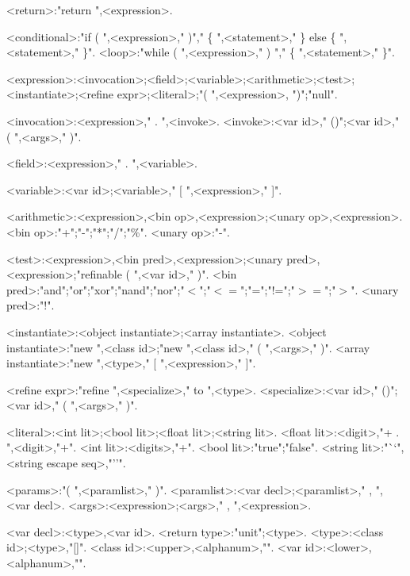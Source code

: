 \begin{grammar}
<return>:"return ",<expression>.

<conditional>:"if ( ",<expression>," )"," \{ ",<statement>,"{\small *} \} else \{ ",<statement>,"{\small *} \}".
<loop>:"while ( ",<expression>," ) "," \{ ",<statement>,"{\small *} \}".

<expression>:<invocation>;<field>;<variable>;<arithmetic>;<test>;<instantiate>;<refine expr>;<literal>;"( ",<expression>, ")";"null".

<invocation>:<expression>," . ",<invoke>.
<invoke>:<var id>," ()";<var id>," ( ",<args>," )".

<field>:<expression>," . ",<variable>.

<variable>:<var id>;<variable>," [ ",<expression>," ]".

<arithmetic>:<expression>,<bin op>,<expression>;<unary op>,<expression>.
<bin op>:"+";"-";"*";"/";"\%".
<unary op>:"-".

<test>:<expression>,<bin pred>,<expression>;<unary pred>,<expression>;"refinable ( ",<var id>," )".
<bin pred>:"and";"or";"xor";"nand";"nor";"$<$";"$<=$";"=";"!=";"$>=$";"$>$".
<unary pred>:"!".

<instantiate>:<object instantiate>;<array instantiate>.
<object instantiate>:"new ",<class id>;"new ",<class id>," ( ",<args>," )".
<array instantiate>:"new ",<type>," [ ",<expression>," ]".

<refine expr>:"refine ",<specialize>," to ",<type>.
<specialize>:<var id>," ()";<var id>," ( ",<args>," )".

<literal>:<int lit>;<bool lit>;<float lit>;<string lit>.
<float lit>:<digit>,"{\small +} . ",<digit>,"{\small +}".
<int lit>:<digits>,"{\small +}".
<bool lit>:"true";"false".
<string lit>:"``",<string escape seq>,"''".

<params>:"( ",<paramlist>," )".
<paramlist>:<var decl>;<paramlist>," , ",<var decl>.
<args>:<expression>;<args>," , ",<expression>.

<var decl>:<type>,<var id>.
<return type>:"unit";<type>.
<type>:<class id>;<type>,"[]".
<class id>:<upper>,<alphanum>,"{\small *}".
<var id>:<lower>,<alphanum>,"{\small *}".

\end{grammar}
